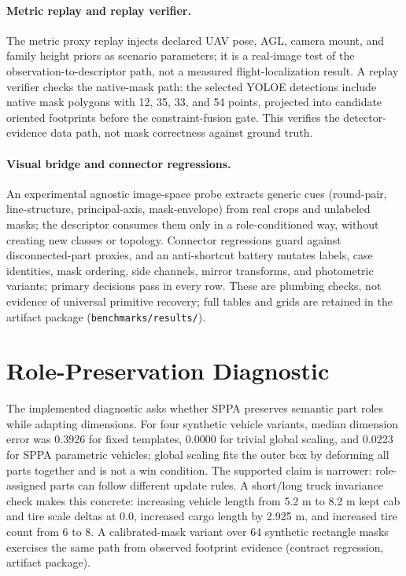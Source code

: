 \documentclass[10pt]{article}
\begin{document}
\paragraph{Metric replay and replay verifier.}
The metric proxy replay injects declared UAV pose, AGL, camera mount, and
family height priors as scenario parameters; it is a real-image test of the
observation-to-descriptor path, not a measured flight-localization result. A
replay verifier checks the native-mask path: the selected YOLOE detections
include native mask polygons with 12, 35, 33, and 54 points, projected into
candidate oriented footprints before the constraint-fusion gate. This verifies
the detector-evidence data path, not mask correctness against ground truth.

\paragraph{Visual bridge and connector regressions.}
An experimental agnostic image-space probe extracts generic cues (round-pair,
line-structure, principal-axis, mask-envelope) from real crops and unlabeled
masks; the descriptor consumes them only in a role-conditioned way, without
creating new classes or topology. Connector regressions guard against
disconnected-part proxies, and an anti-shortcut battery mutates labels, case
identities, mask ordering, side channels, mirror transforms, and photometric
variants; primary decisions pass in every row. These are plumbing checks, not
evidence of universal primitive recovery; full tables and grids are retained
in the artifact package (\texttt{benchmarks/results/}).


\section{Role-Preservation Diagnostic}
\label{sec:supp-role-preservation}

The implemented diagnostic asks whether SPPA preserves semantic part roles
while adapting dimensions. For four synthetic vehicle variants, median
dimension error was 0.3926 for fixed templates, 0.0000 for trivial global
scaling, and 0.0223 for SPPA parametric vehicles; global scaling fits the
outer box by deforming all parts together and is not a win condition. The
supported claim is narrower: role-assigned parts can follow different update
rules. A short/long truck invariance check makes this concrete: increasing
vehicle length from 5.2 m to 8.2 m kept cab and tire scale deltas at 0.0,
increased cargo length by 2.925 m, and increased tire count from 6 to 8. A
calibrated-mask variant over 64 synthetic rectangle masks exercises the same
path from observed footprint evidence (contract regression, artifact
package).
\end{document}

